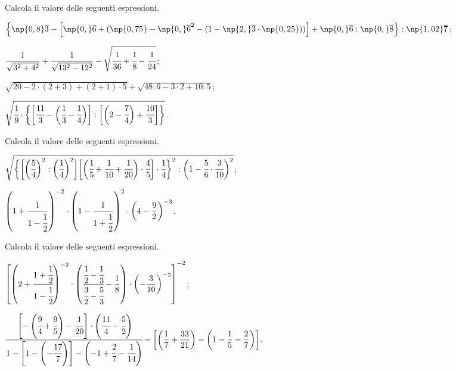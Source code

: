 \begin{esercizio}[\Ast]%
 Calcola il valore delle seguenti espressioni.
\begin{enumeratea}
\spazielenx
\item $\displaystyle{\left\{\np{0,8}\overline{3}-\left[\np{0,}\overline{6}+(\np{0,75}-{\np{0,}\overline{6}}^{2}-(1-\np{2,}\overline{3}\cdot%
\np{0,25}))\right]+\np{0,}\overline{6}:\np{0,}\overline{8}\right\}:\np{1,02}\overline{7}}$;
\item $\displaystyle{\frac{1}{\sqrt{3^{2}+4^{2}}}+\frac{1}{\sqrt{13^{2}-12^2}}-\sqrt{\cfrac{1}{36}+\cfrac{1}{8}%
-\cfrac{1}{24}}}$;
\item $\displaystyle{\sqrt{20-2\cdot(2+3)+(2+1)\cdot5}+\sqrt{48:6-3\cdot2+10:5}}$;
\item $\displaystyle{\sqrt{\cfrac{1}{9}\cdot\bigg\{\bigg[\cfrac{11}{3}-\bigg(\cfrac{1}{3}-\cfrac{1}{4}\bigg)\bigg]:%
\bigg[\bigg(2-\cfrac{7}{4}\bigg)+\cfrac{10}{3}\bigg]\bigg\}}}$.
\end{enumeratea}
\end{esercizio}

\begin{esercizio}[\Ast]%
 Calcola il valore delle seguenti espressioni.
\begin{enumeratea}
\spazielenx
\item $\displaystyle{\sqrt{\bigg\{\bigg[\bigg(\cfrac{5}{4}\bigg)^{2}:\bigg(\cfrac{1}{4}\bigg)^{2}\bigg]%
\bigg[\bigg(\cfrac{1}{5}+\cfrac{1}{10}+\cfrac{1}{20}\bigg)\cdot\cfrac{4}{5}\bigg]\cdot\cfrac{1}{4}\bigg\}^{2}%
:\bigg(1-\cfrac{5}{6}\cdot\cfrac{3}{10}\bigg)^{2}}}$;
\item $\displaystyle{\left(1+\frac{1}{1-\cfrac{1}{2}}\right)^{-2}\cdot\left(1-\frac{1}{1+\cfrac{1}{2}}\right)^{2}\cdot%
\bigg(4-\frac{9}{2}\bigg)^{-3}}$.
\end{enumeratea}
\end{esercizio}

\begin{esercizio}[\Ast]%
 Calcola il valore delle seguenti espressioni.
\begin{enumeratea}
\item $\displaystyle{\left[\left(2+\cfrac{1+\cfrac{1}{2}}{1-\cfrac{1}{2}}\right)^{-3}\cdot\left(\cfrac{\cfrac{1}{2}-\cfrac{1}{3}}%
{\cfrac{3}{2}-\cfrac{5}{3}}-\frac{1}{8}\right)\cdot\left(-{\frac{3}{10}}\right)^{-2}\right]^{-2}}$;
\item $\displaystyle{\cfrac{\left[-\left(\cfrac{9}{4}+\cfrac{9}{5}\right)-\cfrac{1}{20}\right]\cdot\left(\cfrac{11}{4}-\cfrac{5}{2}\right)}%
{1-\left[1-\left(-{\cfrac{17}{7}}\right)\right]-\left(-1+\cfrac{2}{7}-\cfrac{1}{14}\right)}%
-\bigg[\bigg(\frac{1}{7}+\frac{33}{21}\bigg)-\bigg(1-\frac{1}{5}-\frac{2}{7}\bigg)\bigg]}$.

\end{enumeratea}
\end{esercizio}

